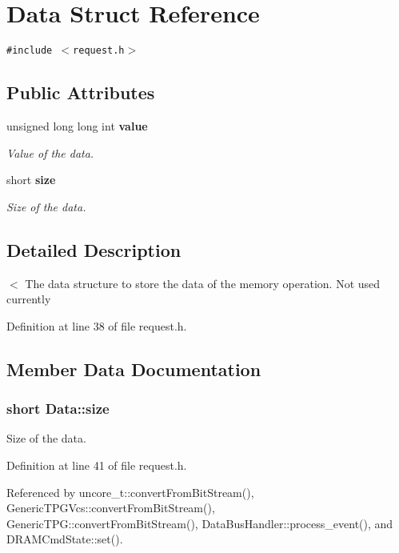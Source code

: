 \section{Data Struct Reference}
\label{structData}
{\tt \#include $<$request.h$>$}

\subsection*{Public Attributes}
\begin{CompactItemize}
\item 
unsigned long long int {\bf value}
\begin{CompactList}\small\item\em Value of the data. \item\end{CompactList}\item 
short {\bf size}
\begin{CompactList}\small\item\em Size of the data. \item\end{CompactList}\end{CompactItemize}


\subsection{Detailed Description}
$<$ The data structure to store the data of the memory operation. Not used currently 

Definition at line 38 of file request.h.

\subsection{Member Data Documentation}
\subsubsection[{size}]{\setlength{\rightskip}{0pt plus 5cm}short {\bf Data::size}}\label{structData_3c66751e9b4f4968ad69df84c7922422}


Size of the data. 



Definition at line 41 of file request.h.

Referenced by uncore\_\-t::convertFromBitStream(), GenericTPGVcs::convertFromBitStream(), GenericTPG::convertFromBitStream(), DataBusHandler::process\_\-event(), and DRAMCmdState::set().
